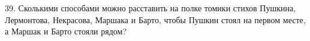 39. Сколькими способами можно расставить на полке томики стихов Пушкина, Лермонтова, Некрасова, Маршака и Барто, чтобы Пушкин стоял на первом месте, а Маршак и Барто стояли рядом?\\
